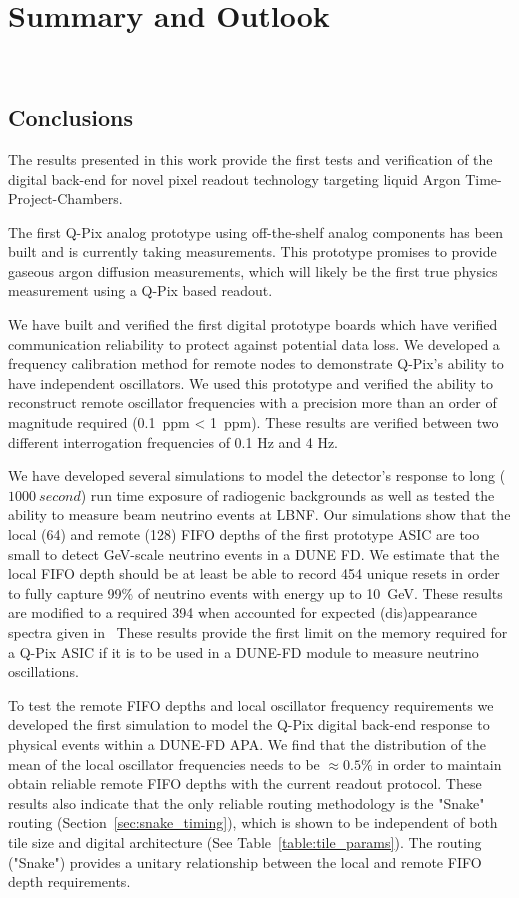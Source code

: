 \chapter{Summary and Outlook}~\label{chap:summary}

\section{Conclusions}

The results presented in this work provide the first tests and verification of the digital back-end for novel pixel readout technology targeting liquid Argon Time-Project-Chambers.

The first Q-Pix analog prototype using off-the-shelf analog components has been built and is currently taking measurements.
This prototype promises to provide gaseous argon diffusion measurements, which will likely be the first true physics measurement using a Q-Pix based readout.

We have built and verified the first digital prototype boards which have verified communication reliability to protect against potential data loss.
We developed a frequency calibration method for remote nodes to demonstrate Q-Pix's ability to have independent oscillators.
We used this prototype and verified the ability to reconstruct remote oscillator frequencies with a precision more than an order of magnitude required (0.1~\unit{ppm} < 1~\unit{ppm}).
These results are verified between two different interrogation frequencies of 0.1 Hz and 4 Hz.

We have developed several simulations to model the detector's response to long ($1000~\unit{second}$) run time exposure of radiogenic backgrounds as well as tested the ability to measure beam neutrino events at LBNF.
Our simulations show that the local (64) and remote (128) FIFO depths of the first prototype ASIC are too small to detect \unit{GeV}-scale neutrino events in a DUNE FD.
We estimate that the local FIFO depth should be at least be able to record 454 unique resets in order to fully capture 99\% of neutrino events with energy up to 10~\unit{GeV}.
These results are modified to a required 394 when accounted for expected (dis)appearance spectra given in~\citep{DUNE_FD_TDRv2_2020}
These results provide the first limit on the memory required for a Q-Pix ASIC if it is to be used in a DUNE-FD module to measure neutrino oscillations.

To test the remote FIFO depths and local oscillator frequency requirements we developed the first simulation to model the Q-Pix digital back-end response to physical events within a DUNE-FD APA.
We find that the distribution of the mean of the local oscillator frequencies needs to be $\approx 0.5\%$ in order to maintain obtain reliable remote FIFO depths with the current readout protocol. 
These results also indicate that the only reliable routing methodology is the "Snake" routing (Section~\ref{sec:snake_timing}), which is shown to be independent of both tile size and digital architecture (See Table~\ref{table:tile_params}).
The routing ("Snake") provides a unitary relationship between the local and remote FIFO depth requirements.

